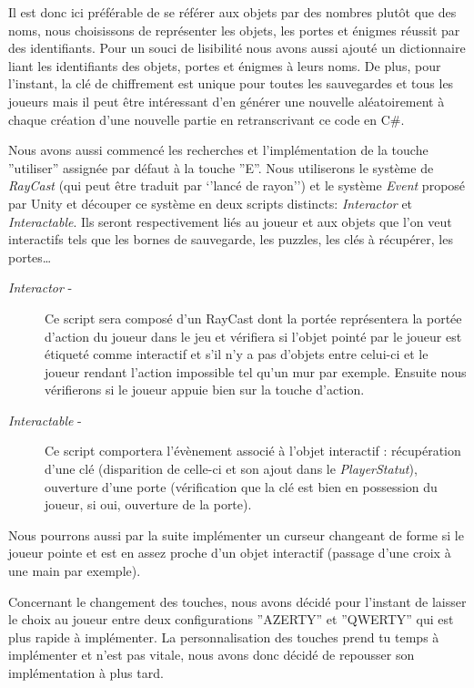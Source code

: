 Il est donc ici préférable de se référer aux objets par des nombres plutôt que des noms, nous choisissons de représenter les objets, les portes et énigmes réussit par des identifiants.
Pour un souci de lisibilité nous avons aussi ajouté un dictionnaire liant les identifiants des objets, portes et énigmes à leurs noms.
\newline
De plus, pour l’instant, la clé de chiffrement est unique pour toutes les sauvegardes et tous les joueurs mais il peut être intéressant d’en générer une nouvelle aléatoirement à chaque création d’une nouvelle partie en retranscrivant ce code en C\#.


Nous avons aussi commencé les recherches et l’implémentation de la touche ''utiliser'' assignée par défaut à la touche ''E''. Nous utiliserons le système de \emph{RayCast} (qui peut être traduit par ‘’lancé de rayon’’) et le système \emph{Event} proposé par Unity et découper ce système en deux scripts distincts: \emph{Interactor} et \emph{Interactable}. Ils seront respectivement liés au joueur et aux objets que l’on veut interactifs tels que les bornes de sauvegarde, les puzzles, les clés à récupérer, les portes…
\newline
\begin{description}
    \item[\emph{Interactor} -] Ce script sera composé d’un RayCast dont la portée représentera la portée d’action du joueur dans le jeu et vérifiera si l’objet pointé par le joueur est étiqueté comme interactif et s’il n’y a pas d’objets entre celui-ci et le joueur rendant l’action impossible tel qu'un mur par exemple. Ensuite nous vérifierons si le joueur appuie bien sur la touche d’action.
    \item[\emph{Interactable} -] Ce script comportera l’évènement associé à l’objet interactif : récupération d’une clé (disparition de celle-ci et son ajout dans le \emph{PlayerStatut}), ouverture d’une porte (vérification que la clé est bien en possession du joueur, si oui, ouverture de la porte).
\end{description}
\par
Nous pourrons aussi par la suite implémenter un curseur changeant de forme si le joueur pointe et est en assez proche d’un objet interactif (passage d’une croix à une main par exemple).
\par
Concernant le changement des touches, nous avons décidé pour l’instant de laisser le choix au joueur entre deux configurations ''AZERTY'' et ''QWERTY'' qui est plus rapide à implémenter. La personnalisation des touches prend tu temps à implémenter et n’est pas vitale, nous avons donc décidé de repousser son implémentation à plus tard.


